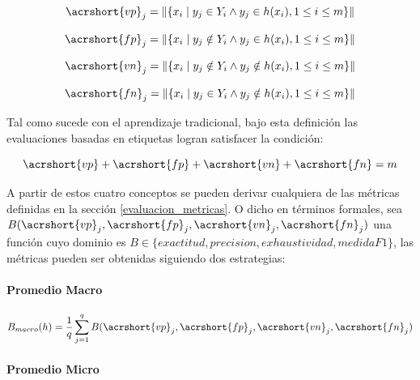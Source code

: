 \begin{equation}
   \acrshort{vp}_{j} = \left\|\{x_{i}\mid y_{j} \in Y_{i} \land y_{j} \in
   h(x_{i}), 1 \leq i \leq m\}\right\|
\end{equation}

\begin{equation}
   \acrshort{fp}_{j} = \left\|\{x_{i}\mid y_{j} \notin Y_{i} \land y_{j} \in
   h(x_{i}), 1 \leq i \leq m\}\right\|
\end{equation}

\begin{equation}
   \acrshort{vn}_{j} = \left\|\{x_{i}\mid y_{j} \notin Y_{i} \land y_{j} \notin
   h(x_{i}), 1 \leq i \leq m\}\right\|
\end{equation}

\begin{equation} 
   \acrshort{fn}_{j} = \left\|\{x_{i}\mid y_{j} \in Y_{i} \land y_{j} \notin
   h(x_{i}), 1 \leq i \leq m\}\right\| 
\end{equation}

Tal como sucede con el aprendizaje tradicional, bajo esta definición las
evaluaciones basadas en etiquetas logran satisfacer la condición:

\begin{equation}
   \acrshort{vp} + \acrshort{fp} + \acrshort{vn} + \acrshort{fn} = m
\end{equation}

A partir de estos cuatro conceptos se pueden derivar cualquiera de las métricas
definidas en la sección \ref{evaluacion_metricas}. O dicho en términos formales,
sea $B(\acrshort{vp}_{j}, \acrshort{fp}_{j}, \acrshort{vn}_{j},
\acrshort{fn}_{j})$ una función cuyo dominio es $B \in \{ exactitud, precision,
exhaustividad, medidaF1 \}$, las métricas pueden ser obtenidas siguiendo dos
estrategias:

\paragraph{Promedio Macro}

\begin{equation}
   B_{macro}(h) = \frac{1}{q} \sum_{j=1}^{q} 
   B(\acrshort{vp}_{j}, \acrshort{fp}_{j}, \acrshort{vn}_{j}, \acrshort{fn}_{j})
\end{equation}

\paragraph{Promedio Micro}


